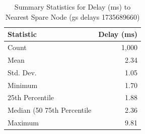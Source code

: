 \begin{table}[htbp]
\centering
\caption{Summary Statistics for Delay (ms) to Nearest Spare Node (gs delays 1735689660)}
\label{tab:coverage_stats_gs_delays_1735689660}
\begin{tabular}{lr}
\toprule
Statistic & Delay (ms) \\
\midrule
Count & 1,000 \\
Mean & 2.34 \\
Std. Dev. & 1.05 \\
Minimum & 1.70 \\
25th Percentile & 1.88 \\
Median (50%
75th Percentile & 2.36 \\
Maximum & 9.81 \\
\bottomrule
\end{tabular}
\end{table}
